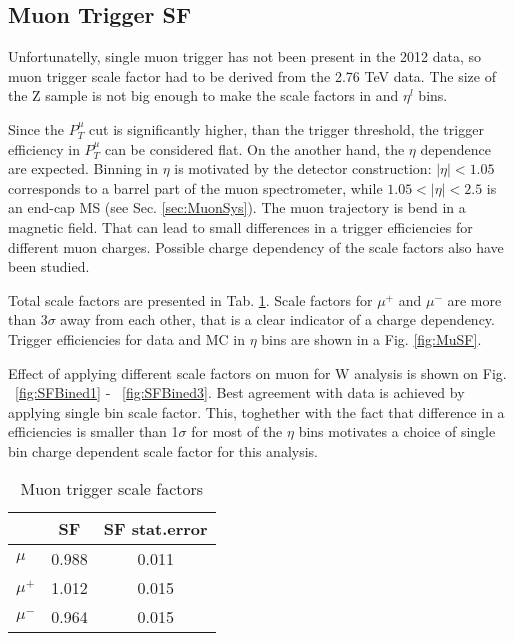 \subsection{Muon Trigger SF}
Unfortunatelly, single muon trigger has not been present in the 2012 data, so muon trigger scale factor had to be derived from the 2.76 TeV data. The size of the Z sample is not big enough to make the scale factors in \ptl and $\eta^{l}$ bins. 

Since the $P_{T}^{\mu}$ cut is significantly higher, than the trigger threshold, the trigger efficiency in $P_{T}^{\mu}$ can be considered flat. On the another hand, the $\eta$ dependence are expected. Binning in $\eta$ is motivated by the detector construction: $|\eta|<1.05$ corresponds to a barrel part of the muon spectrometer, while $1.05<|\eta|<2.5$ is an end-cap MS (see Sec. \ref{sec:MuonSys}). The muon trajectory is bend in a magnetic field. That can lead to small differences in a trigger efficiencies for different muon charges. Possible charge dependency of the scale factors also have been studied. 

Total scale factors are presented in Tab. \ref{tab:MuonSF}. Scale factors for $\mu^{+}$ and $\mu^{-}$ are more than 3$\sigma$ away from each other, that is a clear indicator of a charge dependency. Trigger efficiencies for data and MC in $\eta$ bins are shown in a Fig. \ref{fig:MuSF}. 

Effect of applying different scale factors on muon for W analysis is shown on Fig. ~\ref{fig:SFBined1} - ~\ref{fig:SFBined3}. Best agreement with data is achieved by applying single bin scale factor. This, toghether with the fact that difference in a efficiencies is smaller than 1$\sigma$ for most of the $\eta$ bins motivates a choice of single bin charge dependent scale factor for this analysis. 

\begin{table}[!t]
    \caption{Muon trigger scale factors}
	\label{tab:MuonSF}
	\begin{center}
		\begin{tabular}{|l | c | c|}
		\hline
		& SF & SF stat.error\\
		\hline
		\hline
		$\mu$ & 0.988 & 0.011\\
		\hline
		$\mu^{+}$ & 1.012 & 0.015\\
		$\mu^{-}$ & 0.964 & 0.015\\
		\hline
		\end{tabular}
		\end{center}
\end{table}


